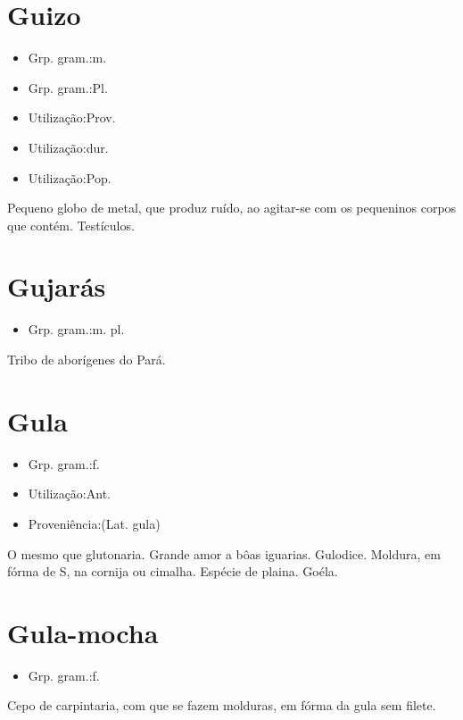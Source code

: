 \section{Guizo}
\begin{itemize}
\item {Grp. gram.:m.}
\end{itemize}
\begin{itemize}
\item {Grp. gram.:Pl.}
\end{itemize}
\begin{itemize}
\item {Utilização:Prov.}
\end{itemize}
\begin{itemize}
\item {Utilização:dur.}
\end{itemize}
\begin{itemize}
\item {Utilização:Pop.}
\end{itemize}
Pequeno globo de metal, que produz ruído, ao agitar-se com os pequeninos corpos que contém.
Testículos.
\section{Gujarás}
\begin{itemize}
\item {Grp. gram.:m. pl.}
\end{itemize}
Tribo de aborígenes do Pará.
\section{Gula}
\begin{itemize}
\item {Grp. gram.:f.}
\end{itemize}
\begin{itemize}
\item {Utilização:Ant.}
\end{itemize}
\begin{itemize}
\item {Proveniência:(Lat. \textunderscore gula\textunderscore )}
\end{itemize}
O mesmo que \textunderscore glutonaria\textunderscore .
Grande amor a bôas iguarias.
Gulodice.
Moldura, em fórma de S, na cornija ou cimalha.
Espécie de plaina.
Goéla.
\section{Gula-mocha}
\begin{itemize}
\item {Grp. gram.:f.}
\end{itemize}
Cepo de carpintaria, com que se fazem molduras, em fórma da gula sem filete.
